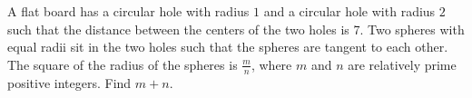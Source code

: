 A flat board has a circular hole with radius $1$ and a circular hole with radius $2$ such that the distance between the centers of the two holes is 7. Two spheres with equal radii sit in the two holes such that the spheres are tangent to each other. The square of the radius of the spheres is $\frac{m}n$, where $m$ and $n$ are relatively prime positive integers. Find $m+n$.